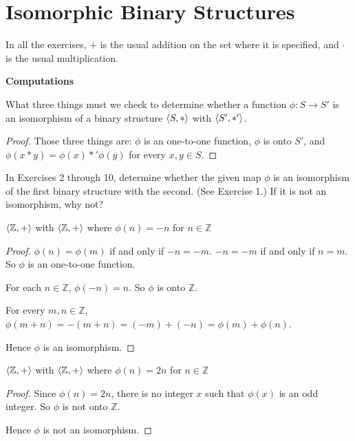 \section{Isomorphic Binary Structures}
\setcounter{exercise}{0}

In all the exercises, $+$ is the usual addition on the set where it is specified, and $\cdot$ is the usual multiplication.

\textbf{Computations}

\begin{exercise}
    What three things must we check to determine whether a function $\phi: S\to S'$ is an isomorphism of a binary structure $\left\langle{S, *}\right\rangle$ with $\left\langle{S', *'}\right\rangle$.
\end{exercise}

\begin{proof}
    Those three things are: $\phi$ is an one-to-one function, $\phi$ is onto $S'$, and $\phi(x * y) = \phi(x) *' \phi(y)$ for every $x, y\in S$.
\end{proof}

In Exercises 2 through 10, determine whether the given map $\phi$ is an isomorphism of the first binary structure with the second. (See Exercise 1.) If it is not an isomorphism, why not?

\begin{exercise}
    $\left\langle{\mathbb{Z}, +}\right\rangle$ with $\left\langle{\mathbb{Z}, +}\right\rangle$ where $\phi(n) = -n$ for $n\in\mathbb{Z}$
\end{exercise}

\begin{proof}
    $\phi(n) = \phi(m)$ if and only if $-n = -m$. $-n = -m$ if and only if $n = m$. So $\phi$ is an one-to-one function.

    For each $n\in\mathbb{Z}$, $\phi(-n) = n$. So $\phi$ is onto $\mathbb{Z}$.

    For every $m, n\in\mathbb{Z}$, $\phi(m + n) = -(m + n) = (-m) + (-n) = \phi(m) + \phi(n)$.

    Hence $\phi$ is an isomorphism.
\end{proof}

\begin{exercise}
    $\left\langle{\mathbb{Z}, +}\right\rangle$ with $\left\langle{\mathbb{Z}, +}\right\rangle$ where $\phi(n) = 2n$ for $n\in\mathbb{Z}$
\end{exercise}

\begin{proof}
    Since $\phi(n) = 2n$, there is no integer $x$ such that $\phi(x)$ is an odd integer. So $\phi$ is not onto $\mathbb{Z}$.

    Hence $\phi$ is not an isomorphism.
\end{proof}

